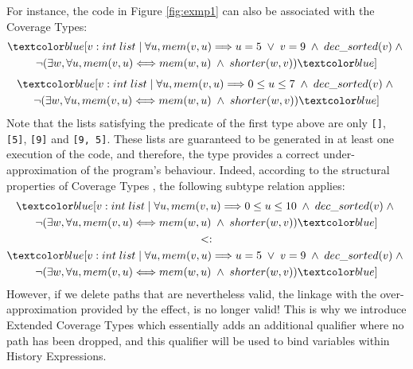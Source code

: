 For instance, the code in Figure \ref{fig:exmp1} can also be associated with the Coverage Types:
\begin{equation}
    \begin{gathered}
        \under{v: int\;list \;|\; \forall u, mem(v, u) \Longrightarrow u = 5 \;\lor\; v = 9 \;\land\; dec\_sorted(v) \;\land\; \\
        \neg(\exists w, \forall u, mem(v, u) \Longleftrightarrow mem(w, u) \;\land\; shorter(w, v))}
    \end{gathered}
\end{equation}
\begin{equation}
    \begin{gathered}
        \under{v: int\;list \;|\; \forall u, mem(v, u) \Longrightarrow 0 \leq u \leq 7 \;\land\; dec\_sorted(v) \;\land\; \\
        \neg(\exists w, \forall u, mem(v, u) \Longleftrightarrow mem(w, u) \;\land\; shorter(w, v))}
    \end{gathered}
\end{equation}
Note that the lists satisfying the predicate of the first type above are only \verb|[]|, \verb|[5]|, \verb|[9]| and \verb|[9, 5]|. These lists are guaranteed to be generated in at least one execution of the code, and therefore, the type provides a correct under-approximation of the program's behaviour. Indeed, according to the structural properties of Coverage Types \cite{coverage}, the following subtype relation applies:
\begin{equation}
    \begin{gathered}
        \under{v: int\;list \;|\; \forall u, mem(v, u) \Longrightarrow 0 \leq u \leq 10 \;\land\; dec\_sorted(v) \;\land\; \\
        \neg(\exists w, \forall u, mem(v, u) \Longleftrightarrow mem(w, u) \;\land\; shorter(w, v))} \\
        <: \\
        \under{v: int\;list \;|\; \forall u, mem(v, u) \Longrightarrow u = 5 \;\lor\; v = 9 \;\land\; dec\_sorted(v) \;\land\; \\
        \neg(\exists w, \forall u, mem(v, u) \Longleftrightarrow mem(w, u) \;\land\; shorter(w, v))}
    \end{gathered}
\end{equation}
However, if we delete paths that are nevertheless valid, the linkage with the over-approximation provided by the effect, is no longer valid! This is why we introduce Extended Coverage Types which essentially adds an additional qualifier where no path has been dropped, and this qualifier will be used to bind variables within History Expressions.